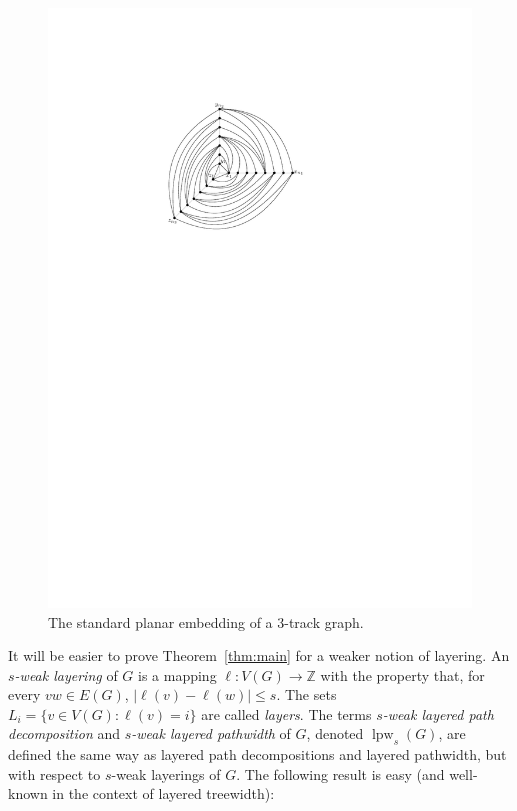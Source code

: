 \documentclass{jgaa-art}
\newcommand{\Z}{\mathbb{Z}}
\newcommand{\figlabel}[1]{\label{fig:#1}}
\newcommand{\thmref}[1]{Theorem~\ref{thm:#1}}
\DeclareMathOperator{\lpw}{lpw}
\begin{document}
\begin{figure}
  \begin{center}
     \includegraphics{figs/graph-1}
  \end{center}
  \caption{The standard planar embedding of a 3-track graph.}
  \figlabel{planar-view}
\end{figure}

It will be easier to prove \thmref{main} for a weaker notion
of layering.  An \emph{$s$-weak layering} of $G$ is a mapping
$\ell:V(G)\to\Z$ with the property that, for every $vw\in E(G)$,
$|\ell(v)-\ell(w)|\le s$.  The sets $L_i=\{v\in V(G): \ell(v)=i\}$
are called \emph{layers}.  The terms \emph{$s$-weak layered path
decomposition} and \emph{$s$-weak layered pathwidth} of $G$, denoted
$\lpw_s(G)$, are defined the same way as layered path decompositions
and layered pathwidth, but with respect to $s$-weak layerings of $G$. The following result is easy (and well-known in the context of layered treewidth):
\end{document}

